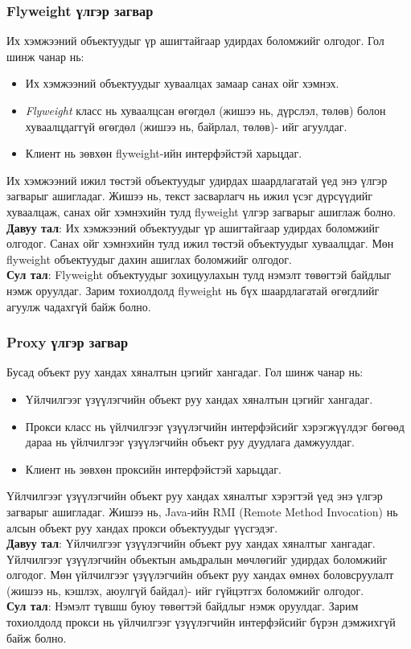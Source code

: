 \subsubsection{Flyweight үлгэр загвар}
\quad \quad Их хэмжээний объектуудыг үр ашигтайгаар удирдах боломжийг олгодог. Гол шинж чанар нь:
\begin{itemize}
	\item Их хэмжээний объектуудыг хуваалцах замаар санах ойг хэмнэх.
	\item \textit{Flyweight} класс нь хуваалцсан өгөгдөл (жишээ нь, дүрслэл, төлөв) болон хуваалцдаггүй өгөгдөл (жишээ нь, байрлал, төлөв)- ийг агуулдаг.
	\item Клиент нь зөвхөн flyweight-ийн интерфэйстэй харьцдаг.
\end{itemize}
Их хэмжээний ижил төстэй объектуудыг удирдах шаардлагатай үед энэ үлгэр загварыг ашигладаг. Жишээ нь, текст засварлагч нь ижил үсэг дүрсүүдийг хуваалцаж, санах ойг хэмнэхийн тулд flyweight үлгэр загварыг ашиглаж болно.\\
\textbf{Давуу тал}: Их хэмжээний объектуудыг үр ашигтайгаар удирдах боломжийг олгодог. Санах ойг хэмнэхийн тулд ижил төстэй объектуудыг хуваалцдаг. Мөн flyweight объектуудыг дахин ашиглах боломжийг олгодог.\\
\textbf{Сул тал}: Flyweight объектуудыг зохицуулахын тулд нэмэлт төвөгтэй байдлыг нэмж оруулдаг. Зарим тохиолдолд flyweight нь бүх шаардлагатай өгөгдлийг агуулж чадахгүй байж болно.	

\subsubsection{Proxy үлгэр загвар}
\quad \quad Бусад объект руу хандах хяналтын цэгийг хангадаг. Гол шинж чанар нь:
\begin{itemize}
	\item Үйлчилгээг үзүүлэгчийн объект руу хандах хяналтын цэгийг хангадаг.
	\item Прокси класс нь үйлчилгээг үзүүлэгчийн интерфэйсийг хэрэгжүүлдэг бөгөөд дараа нь үйлчилгээг үзүүлэгчийн объект руу дуудлага дамжуулдаг.
	\item Клиент нь зөвхөн проксийн интерфэйстэй харьцдаг.
\end{itemize}
Үйлчилгээг үзүүлэгчийн объект руу хандах хяналтыг хэрэгтэй үед энэ үлгэр загварыг ашигладаг. Жишээ нь, Java-ийн RMI (Remote Method Invocation) нь алсын объект руу хандах прокси объектуудыг үүсгэдэг.\\
\textbf{Давуу тал}: Үйлчилгээг үзүүлэгчийн объект руу хандах хяналтыг хангадаг. Үйлчилгээг үзүүлэгчийн объектын амьдралын мөчлөгийг удирдах боломжийг олгодог. Мөн үйлчилгээг үзүүлэгчийн объект руу хандах өмнөх боловсруулалт (жишээ нь, кэшлэх, аюулгүй байдал)- ийг гүйцэтгэх боломжийг олгодог.\\
\textbf{Сул тал}: Нэмэлт түвшш буюу төвөгтэй байдлыг нэмж оруулдаг. Зарим тохиолдолд прокси нь үйлчилгээг үзүүлэгчийн интерфэйсийг бүрэн дэмжихгүй байж болно.		

